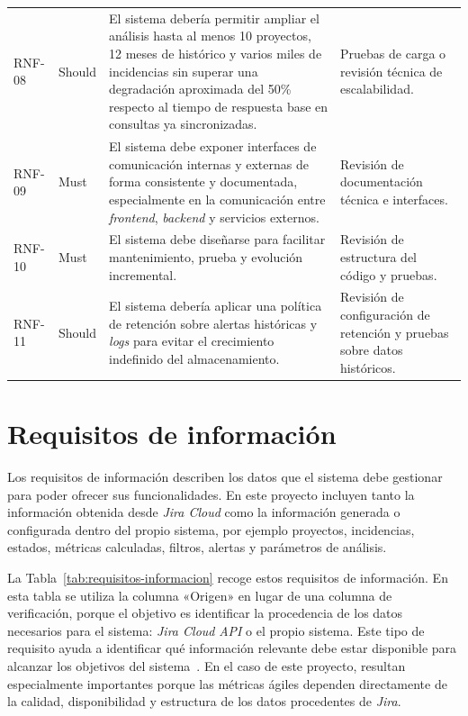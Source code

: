 {\begin{longtable}{p{1.35cm}p{1.65cm}p{6.9cm}p{2.9cm}}
RNF-08 & Should & El sistema debería permitir ampliar el análisis hasta al menos 10 proyectos, 12 meses de histórico y varios miles de incidencias sin superar una degradación aproximada del 50\% respecto al tiempo de respuesta base en consultas ya sincronizadas. & Pruebas de carga o revisión técnica de escalabilidad. \\
RNF-09 & Must & El sistema debe exponer interfaces de comunicación internas y externas de forma consistente y documentada, especialmente en la comunicación entre \textit{frontend}, \textit{backend} y servicios externos. & Revisión de documentación técnica e interfaces. \\
RNF-10 & Must & El sistema debe diseñarse para facilitar mantenimiento, prueba y evolución incremental. & Revisión de estructura del código y pruebas. \\
RNF-11 & Should & El sistema debería aplicar una política de retención sobre alertas históricas y \textit{logs} para evitar el crecimiento indefinido del almacenamiento. & Revisión de configuración de retención y pruebas sobre datos históricos. \\
\bottomrule
\end{longtable}
\vspace{0.45em}
}

\FloatBarrier
\section{Requisitos de información}

Los requisitos de información describen los datos que el sistema debe gestionar para poder ofrecer sus funcionalidades. En este proyecto incluyen tanto la información obtenida desde \textit{Jira Cloud} como la información generada o configurada dentro del propio sistema, por ejemplo proyectos, incidencias, estados, métricas calculadas, filtros, alertas y parámetros de análisis.

La Tabla~\ref{tab:requisitos-informacion} recoge estos requisitos de información. En esta tabla se utiliza la columna «Origen» en lugar de una columna de verificación, porque el objetivo es identificar la procedencia de los datos necesarios para el sistema: \textit{Jira Cloud} \textit{API} o el propio sistema. Este tipo de requisito ayuda a identificar qué información relevante debe estar disponible para alcanzar los objetivos del sistema~\cite{DuranBernardez2000Elicitacion}. En el caso de este proyecto, resultan especialmente importantes porque las métricas ágiles dependen directamente de la calidad, disponibilidad y estructura de los datos procedentes de \textit{Jira}.

